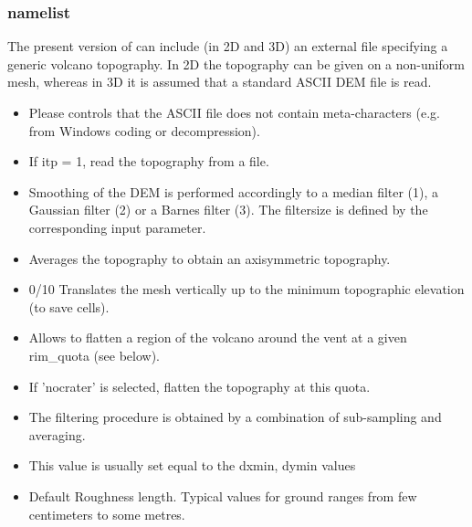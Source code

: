 \subsubsection{ namelist}
The present version of \PDAC can include (in 2D and 3D) an external file specifying a generic volcano topography. In 2D the topography can be given on a non-uniform mesh, whereas in 3D it is assumed that a standard ASCII DEM file is read.

\begin{itemize}
\item
{}
{Please controls that the ASCII file does not contain meta-characters (e.g. from Windows coding or decompression).}

\item
{}
{If itp = 1, read the topography from a file.}

\item
{}
{Smoothing of the DEM is performed accordingly to a median filter (1), a 
Gaussian filter (2) or a Barnes filter (3). The filtersize is defined
by the corresponding input parameter.}

\item
{}
{Averages the topography to obtain an axisymmetric topography.}

\item
{} {0/1}{0}
{Translates the mesh vertically up to the minimum topographic elevation (to save cells).}

\item
{}
{Allows to flatten a region of the volcano around the vent at a given rim\_quota (see below).}

\item
{}
{If 'nocrater' is selected, flatten the topography at this quota.}

\item
{}
{The filtering procedure is obtained by a combination of sub-sampling and averaging.}

\item
{}
{This value is usually set equal to the dxmin, dymin values}

\item
{}
{Default Roughness length. Typical values for ground
ranges from few centimeters to some metres.}

\end{itemize}

